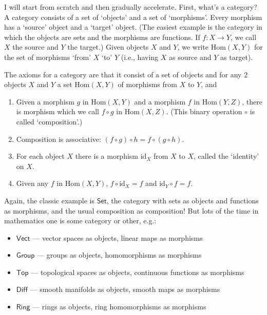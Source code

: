 \documentclass{article}
\def\tightlist{}
\begin{document}
I will start from scratch and then gradually accelerate. First, what's a
category? A category consists of a set of `objects' and a set of
`morphisms'. Every morphism has a `source' object and a `target' object.
(The easiest example is the category in which the objects are sets and
the morphisms are functions. If \(f\colon X\to Y\), we call \(X\) the
source and \(Y\) the target.) Given objects \(X\) and \(Y\), we write
\(\mathrm{Hom}(X,Y)\) for the set of morphisms `from' \(X\) `to' \(Y\)
(i.e., having \(X\) as source and \(Y\) as target).

The axioms for a category are that it consist of a set of objects and
for any 2 objects \(X\) and \(Y\) a set \(\mathrm{Hom}(X,Y)\) of
morphisms from \(X\) to \(Y\), and

\begin{enumerate}
\def\labelenumi{\alph{enumi})}
\item
  Given a morphism \(g\) in \(\mathrm{Hom}(X,Y)\) and a morphism \(f\)
  in \(\mathrm{Hom}(Y,Z)\), there is morphism which we call \(f\circ g\)
  in \(\mathrm{Hom}(X,Z)\). (This binary operation \(\circ\) is called
  `composition'.)
\item
  Composition is associative: \((f\circ g)\circ h = f\circ (g\circ h)\).
\item
  For each object \(X\) there is a morphism \(\mathrm{id}_X\) from \(X\)
  to \(X\), called the `identity' on \(X\).
\item
  Given any \(f\) in \(\mathrm{Hom}(X,Y)\),
  \(f \circ \mathrm{id}_X = f\) and \(\mathrm{id}_Y \circ f = f\).
\end{enumerate}

Again, the classic example is \(\mathsf{Set}\), the category with sets
as objects and functions as morphisms, and the usual composition as
composition! But lots of the time in mathematics one is some category or
other, e.g.:

\begin{itemize}
\tightlist
\item
  \(\mathsf{Vect}\) --- vector spaces as objects, linear maps as
  morphisms
\item
  \(\mathsf{Group}\) --- groups as objects, homomorphisms as morphisms
\item
  \(\mathsf{Top}\) --- topological spaces as objects, continuous
  functions as morphisms
\item
  \(\mathsf{Diff}\) --- smooth manifolds as objects, smooth maps as
  morphisms
\item
  \(\mathsf{Ring}\) --- rings as objects, ring homomorphisms as
  morphisms
\end{itemize}
\end{document}
